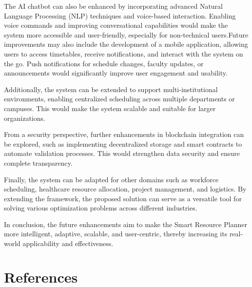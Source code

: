 \documentclass[a4paper, 12pt]{report}
\begin{document}
\par The AI chatbot can also be enhanced by incorporating advanced Natural Language Processing (NLP) techniques and voice-based interaction. Enabling voice commands and improving conversational capabilities would make the system more accessible and user-friendly, especially for non-technical users.Future improvements may also include the development of a mobile application, allowing users to access timetables, receive notifications, and interact with the system on the go. Push notifications for schedule changes, faculty updates, or announcements would significantly improve user engagement and usability.\\

\par Additionally, the system can be extended to support multi-institutional environments, enabling centralized scheduling across multiple departments or campuses. This would make the system scalable and suitable for larger organizations.\\

\par From a security perspective, further enhancements in blockchain integration can be explored, such as implementing decentralized storage and smart contracts to automate validation processes. This would strengthen data security and ensure complete transparency.\\

\par Finally, the system can be adapted for other domains such as workforce scheduling, healthcare resource allocation, project management, and logistics. By extending the framework, the proposed solution can serve as a versatile tool for solving various optimization problems across different industries.\\

\par In conclusion, the future enhancements aim to make the Smart Resource Planner more intelligent, adaptive, scalable, and user-centric, thereby increasing its real-world applicability and effectiveness.

\chapter*{References}
\end{document}
